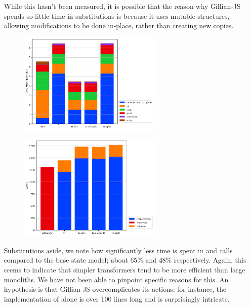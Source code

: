 While this hasn't been measured, it is possible that the reason why Gillian-JS spends so little time in substitutions is because it uses mutable structures, allowing modifications to be done in-place, rather than creating new copies.

\begin{figure}
\captionsetup{width=.4\linewidth}
\centering
\begin{minipage}[t]{.45\textwidth}
	\centering
	\includegraphics[width=7cm]{figures/js/verif_time_spent_per_action.pdf}
	\label{fig:js-timespent-verif}
\end{minipage}\hfill%
\begin{minipage}[t]{.45\textwidth}
	\centering
	\includegraphics[width=7cm]{figures/js/locs.pdf}
	\label{fig:js-loc-count}
\end{minipage}%
\end{figure}

Substitutions aside, we note how significantly less time is spent in \execac{} and \consume{} calls compared to the base state model; about 65\% and 48\% respectively. Again, this seems to indicate that simpler transformers tend to be more efficient than large monoliths. We have not been able to pinpoint specific reasons for this. An hypothesis is that Gillian-JS overcomplicates its actions; for instance, the implementation of  alone is over 100 lines long and is surprisingly intricate.

